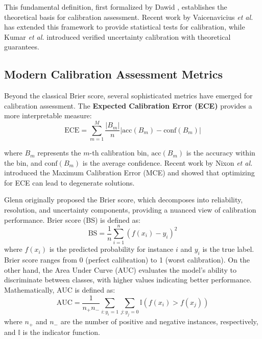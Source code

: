\documentclass[12pt, a4paper]{article}
\begin{document}
This fundamental definition, first formalized by Dawid \cite{dawid1982well}, establishes the theoretical basis for calibration assessment. Recent work by Vaicenavicius \emph{et al.} \cite{vaicenavicius2019evaluating} has extended this framework to provide statistical tests for calibration, while Kumar \emph{et al.} \cite{kumar2019verified} introduced verified uncertainty calibration with theoretical guarantees.

\subsection{Modern Calibration Assessment Metrics}

Beyond the classical Brier score, several sophisticated metrics have emerged for calibration assessment. The \textbf{Expected Calibration Error (ECE)} \cite{naeini2015obtaining} provides a more interpretable measure:
\begin{equation}
\text{ECE} = \sum_{m=1}^{M} \frac{|B_m|}{n} |\text{acc}(B_m) - \text{conf}(B_m)|
\end{equation}

where $B_m$ represents the $m$-th calibration bin, $\text{acc}(B_m)$ is the accuracy within the bin, and $\text{conf}(B_m)$ is the average confidence. Recent work by Nixon \emph{et al.} \cite{nixon2019measuring} introduced the Maximum Calibration Error (MCE) and showed that optimizing for ECE can lead to degenerate solutions. 

Glenn \cite{glenn1950verification} originally proposed the Brier score, which decomposes into reliability, resolution, and uncertainty components, providing a nuanced view of calibration performance. Brier score (BS) is defined as:
\begin{equation}
\text{BS} = \frac{1}{n} \sum_{i=1}^{n} (f(x_i) - y_i)^2
\end{equation}
where $f(x_i)$ is the predicted probability for instance $i$ and $y_i$ is the true label. Brier score ranges from 0 (perfect calibration) to 1 (worst calibration). On the other hand, the Area Under Curve (AUC) \cite{hanley1982meaning} evaluates the model's ability to discriminate between classes, with higher values indicating better performance. Mathematically, AUC is defined as:
\begin{equation}
\text{AUC} = \frac{1}{n_+ n_-} \sum_{i:y_i=1} \sum_{j:y_j=0} \mathbb{I}(f(x_i) > f(x_j))
\end{equation}
where $n_+$ and $n_-$ are the number of positive and negative instances, respectively, and $\mathbb{I}$ is the indicator function.
\end{document}
